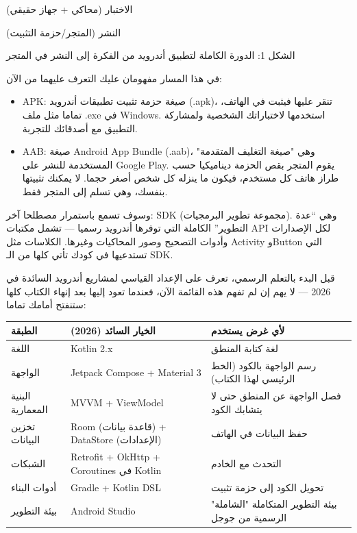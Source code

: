 الاختبار (محاكي + جهاز حقيقي)

النشر (المتجر/حزمة التثبيت)

\begin{center}\small\color{gray}الشكل 1: الدورة الكاملة لتطبيق أندرويد من الفكرة إلى النشر في المتجر\end{center}

في هذا المسار مفهومان عليك التعرف عليهما من الآن:

\begin{itemize}
  \item APK: صيغة حزمة تثبيت تطبيقات أندرويد (.apk)، تنقر عليها فيثبت في الهاتف، تماما مثل ملف .exe في Windows. استخدمها لاختباراتك الشخصية ولمشاركة التطبيق مع أصدقائك للتجربة.
  \item AAB: صيغة Android App Bundle (.aab)، وهي "صيغة التغليف المتقدمة" المستخدمة للنشر على Google Play. يقوم المتجر بقص الحزمة ديناميكيا حسب طراز هاتف كل مستخدم، فيكون ما ينزله كل شخص أصغر حجما. لا يمكنك تثبيتها بنفسك، وهي تسلم إلى المتجر فقط.
\end{itemize}

وسوف تسمع باستمرار مصطلحا آخر: SDK (مجموعة تطوير البرمجيات). وهي “عدة التطوير” الكاملة التي توفرها أندرويد رسميا — تشمل مكتبات API لكل الإصدارات وأدوات التصحيح وصور المحاكيات وغيرها. الكلاسات مثل Activity وButton التي تستدعيها في كودك تأتي كلها من الـ SDK.


قبل البدء بالتعلم الرسمي، تعرف على الإعداد القياسي لمشاريع أندرويد السائدة في 2026 — لا يهم إن لم تفهم هذه القائمة الآن، فعندما تعود إليها بعد إنهاء الكتاب كلها ستنفتح أمامك تماما:

\begin{center}
\begin{tabularx}{\linewidth}{|X|X|X|}
\hline
\textbf{الطبقة} & \textbf{الخيار السائد (2026)} & \textbf{لأي غرض يستخدم} \tabularnewline
\hline
اللغة & Kotlin 2.x & لغة كتابة المنطق \tabularnewline
الواجهة & Jetpack Compose + Material 3 & رسم الواجهة بالكود (الخط الرئيسي لهذا الكتاب) \tabularnewline
البنية المعمارية & MVVM + ViewModel & فصل الواجهة عن المنطق حتى لا يتشابك الكود \tabularnewline
تخزين البيانات & Room (قاعدة بيانات) + DataStore (الإعدادات) & حفظ البيانات في الهاتف \tabularnewline
الشبكات & Retrofit + OkHttp + Coroutines في Kotlin & التحدث مع الخادم \tabularnewline
أدوات البناء & Gradle + Kotlin DSL & تحويل الكود إلى حزمة تثبيت \tabularnewline
بيئة التطوير & Android Studio & بيئة التطوير المتكاملة "الشاملة" الرسمية من جوجل \tabularnewline
\hline
\end{tabularx}
\end{center}

